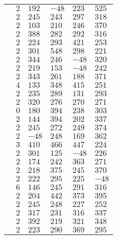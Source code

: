 \documentclass[12pt]{article}
\begin{document}
\begin{table}[]
\begin{tabular}{|l|l|l|l|l|l|}
                & $2$ & $192$ & $-48$ & $223$ & $525$ \\
                & $2$ & $245$ & $243$ & $297$ & $318$ \\
                & $2$ & $103$ & $210$ & $246$ & $370$ \\
                & $2$ & $388$ & $282$ & $292$ & $316$ \\
                & $2$ & $224$ & $293$ & $421$ & $253$ \\
                & $2$ & $301$ & $548$ & $298$ & $221$ \\
                & $2$ & $344$ & $246$ & $-48$ & $320$ \\
                & $2$ & $219$ & $153$ & $-48$ & $242$ \\
                & $2$ & $343$ & $261$ & $188$ & $371$ \\
                & $4$ & $133$ & $348$ & $415$ & $251$ \\
                & $2$ & $235$ & $289$ & $131$ & $293$ \\
                & $2$ & $320$ & $276$ & $270$ & $271$ \\
                & $0$ & $180$ & $394$ & $238$ & $303$ \\
                & $2$ & $144$ & $394$ & $202$ & $337$ \\
                & $2$ & $245$ & $272$ & $249$ & $374$ \\
                & $2$ & $-48$ & $248$ & $169$ & $362$ \\
                & $3$ & $410$ & $466$ & $447$ & $224$ \\
                & $2$ & $301$ & $125$ & $-48$ & $226$ \\
                & $2$ & $174$ & $242$ & $363$ & $271$ \\
                & $2$ & $218$ & $375$ & $245$ & $370$ \\
                & $2$ & $222$ & $295$ & $225$ & $-48$ \\
                & $6$ & $146$ & $245$ & $291$ & $316$ \\
                & $2$ & $204$ & $442$ & $373$ & $395$ \\
                & $2$ & $245$ & $248$ & $227$ & $252$ \\
                & $2$ & $317$ & $231$ & $316$ & $337$ \\
                & $2$ & $392$ & $219$ & $321$ & $348$ \\
                & $2$ & $223$ & $290$ & $369$ & $295$ \\

\end{tabular}
\end{table}
\end{document}
